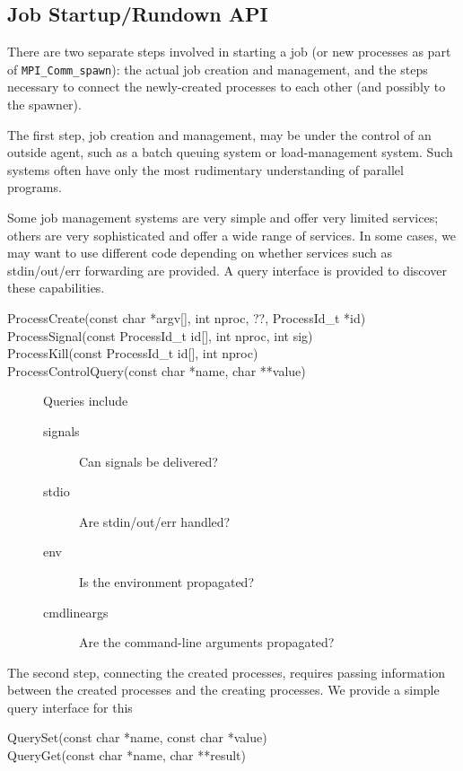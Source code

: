 \documentclass{article}
\let\code=\texttt
\begin{document}
\subsection{Job Startup/Rundown API}

There are two separate steps involved in starting a job (or new processes as
part of \code{MPI\_Comm\_spawn}): the actual job creation and management, and
the steps necessary to connect the newly-created processes to each other (and
possibly to the spawner).  

The first step, job creation and management, may be under the control of an
outside agent, such as a batch queuing system or load-management system.  Such
systems often have only the most rudimentary understanding of parallel
programs.

Some job management systems are very simple and offer very limited
services; others are very sophisticated and offer a wide range of services.
In some cases, we may want to use different code depending on whether services
such as stdin/out/err forwarding are provided.  A query interface is provided
to discover these capabilities.

\begin{description}
\item[{ProcessCreate(const char *argv[], int nproc, ??, ProcessId\_t *id)}]
\item[{ProcessSignal(const ProcessId\_t id[], int nproc, int sig)}]
\item[{ProcessKill(const ProcessId\_t id[], int nproc)}]
\item[ProcessControlQuery(const char *name, char **value)]Queries include
      \begin{description}
      \item[signals]Can signals be delivered?
      \item[stdio]Are stdin/out/err handled?
      \item[env]Is the environment propagated?
      \item[cmdlineargs]Are the command-line arguments propagated?
      \end{description}
\end{description}

The second step, connecting the created processes, requires passing
information between the created processes and the creating processes.  We
provide a simple query interface for this

\begin{description}
\item[QuerySet(const char *name, const char *value)]
\item[QueryGet(const char *name, char **result)]
\end{description}
\end{document}
